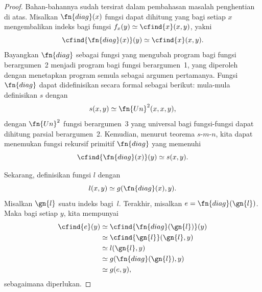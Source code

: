 \documentclass[../../../include/open-logic-section]{subfiles}
\begin{document}
\begin{proof}
Bahan-bahannya sudah tersirat dalam pembahasan masalah penghentian di atas.
Misalkan $\fn{diag}(x)$ fungsi dapat dihitung yang bagi setiap $x$
mengembalikan indeks bagi fungsi $f_x(y) \simeq \cfind{x}(x,y)$, yakni
\[
\cfind{\fn{diag}(x)}(y) \simeq \cfind{x}(x,y).
\]
Bayangkan $\fn{diag}$ sebagai fungsi yang mengubah program bagi fungsi
berargumen~2 menjadi program bagi fungsi berargumen~1, yang diperoleh dengan
menetapkan program semula sebagai argumen pertamanya. Fungsi $\fn{diag}$
dapat didefinisikan secara formal sebagai berikut: mula-mula definisikan $s$
dengan
\[
s(x,y) \simeq \fn{Un}^2(x,x,y),
\]
dengan $\fn{Un}^2$ fungsi berargumen~3 yang universal bagi fungsi-fungsi
dapat dihitung parsial berargumen~2. Kemudian, menurut teorema $s$-$m$-$n$,
kita dapat menemukan fungsi rekursif primitif $\fn{diag}$ yang memenuhi
\[
\cfind{\fn{diag}(x)}(y) \simeq s(x,y).
\]

Sekarang, definisikan fungsi $l$ dengan
\[
l(x,y) \simeq g(\fn{diag}(x),y).
\]
Misalkan $\gn{l}$ suatu indeks bagi~$l$. Terakhir, misalkan
$e=\fn{diag}(\gn{l})$. Maka bagi setiap $y$, kita mempunyai
\begin{align*}
\cfind{e}(y) & \simeq \cfind{\fn{diag}(\gn{l})}(y) \\
& \simeq \cfind{\gn{l}}(\gn{l}, y) \\
& \simeq l(\gn{l}, y) \\
& \simeq g(\fn{diag}(\gn{l}),y) \\
& \simeq g(e, y),
\end{align*}
sebagaimana diperlukan.
\end{proof}
\end{document}
